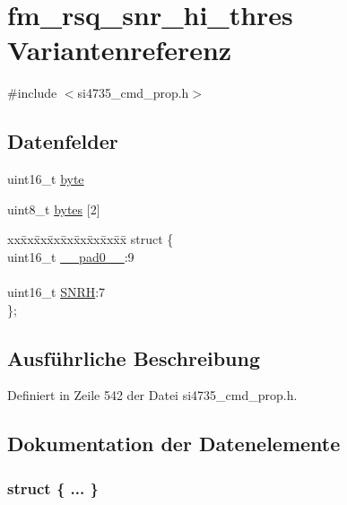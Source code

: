 \hypertarget{unionfm__rsq__snr__hi__thres}{}\section{fm\+\_\+rsq\+\_\+snr\+\_\+hi\+\_\+thres Variantenreferenz}
\label{unionfm__rsq__snr__hi__thres}


{\ttfamily \#include $<$si4735\+\_\+cmd\+\_\+prop.\+h$>$}

\subsection*{Datenfelder}
\begin{DoxyCompactItemize}
\item 
uint16\+\_\+t \hyperlink{unionfm__rsq__snr__hi__thres_ab0549c1b5ea980a02e7eab77e21fea49}{byte}
\item 
uint8\+\_\+t \hyperlink{unionfm__rsq__snr__hi__thres_a46e4c05d20a047ec169f60d3167e912e}{bytes} \mbox{[}2\mbox{]}
\item 
\begin{tabbing}
xx\=xx\=xx\=xx\=xx\=xx\=xx\=xx\=xx\=\kill
struct \{\\
\>uint16\_t \hyperlink{unionfm__rsq__snr__hi__thres_a77132c2c26a75f5b8751b235cda23828}{\_\_pad0\_\_}:9\\
\>\\
\>uint16\_t \hyperlink{unionfm__rsq__snr__hi__thres_ad10645239ad4d7fb5b5f61a834285bb9}{SNRH}:7\\
\}; \\

\end{tabbing}\end{DoxyCompactItemize}


\subsection{Ausführliche Beschreibung}


Definiert in Zeile 542 der Datei si4735\+\_\+cmd\+\_\+prop.\+h.



\subsection{Dokumentation der Datenelemente}
\hypertarget{unionfm__rsq__snr__hi__thres_a2dc8908da5cef97d2d998f9e3e060ef3}{}\subsubsection[{"@59}]{\setlength{\rightskip}{0pt plus 5cm}struct \{ ... \} }\label{unionfm__rsq__snr__hi__thres_a2dc8908da5cef97d2d998f9e3e060ef3}
\hypertarget{unionfm__rsq__snr__hi__thres_a77132c2c26a75f5b8751b235cda23828}{}

